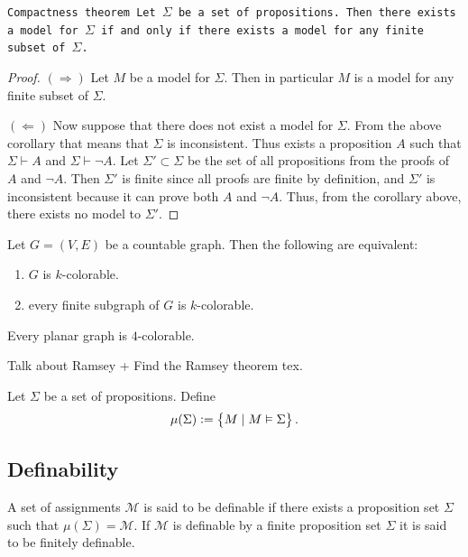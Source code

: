 \documentclass[11pt,a4paper]{article}
\DeclareRobustCommand{\models}{%
  \mathrel{\vDash}%
}
\begin{document}
\begin{theorem}\tt{Compactness theorem}
  Let $\Sigma$ be a set of propositions.
  Then there exists a model for $\Sigma$ if and only if
  there exists a model for any finite subset of $\Sigma$.
\end{theorem}
\begin{proof}
  $(\Rightarrow)$ Let $M$ be a model for $\Sigma$.
  Then in particular $M$ is a model for any finite subset of $\Sigma$.

  $(\Leftarrow)$ Now suppose that there does not exist a model for $\Sigma$.
  From the above corollary that means that $\Sigma$ is inconsistent.
  Thus exists a proposition $A$ such that
  $\Sigma \vdash A$ and $\Sigma \vdash \neg A$.
  Let $\Sigma' \subset \Sigma$ be the set of all propositions from
  the proofs of $A$ and $\neg A$.
  Then $\Sigma'$ is finite since all proofs are finite by definition,
  and $\Sigma'$ is inconsistent because it can prove both $A$ and $\neg A$.
  Thus, from the corollary above, there exists no model to $\Sigma'$.
\end{proof}

\begin{theorem}
  Let $G = (V, E)$ be a countable graph.
  Then the following are equivalent:
  \begin{enumerate}
    \item[(1)] $G$ is $k$-colorable.
    \item[(2)] every finite subgraph of $G$ is $k$-colorable.
  \end{enumerate}
\end{theorem}

\begin{corollary}
  Every planar graph is $4$-colorable.
\end{corollary}

Talk about Ramsey + Find the Ramsey theorem tex.

\begin{definition}
  Let $\Sigma$ be a set of propositions. Define
  \[
    \mu(\Sigma) := \set{M \mid M \models \Sigma}.
  \]
\end{definition}

\subsection{Definability}

\begin{definition}[Definability]
  A set of assignments $\mathcal M$ is said to be definable if there
  exists a proposition set $\Sigma$ such that $\mu(\Sigma) = \mathcal M$.
  If $\mathcal M$ is definable by a finite proposition set $\Sigma$ it is
  said to be finitely definable.
\end{definition}
\end{document}
